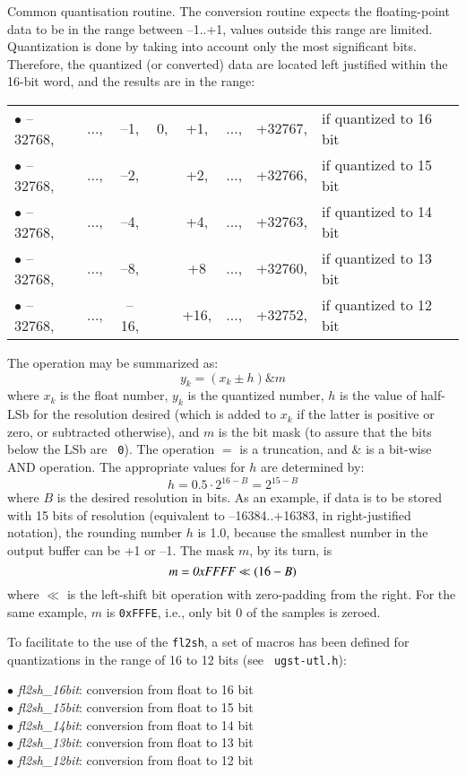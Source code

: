 Common quantisation routine. The conversion routine expects the
floating-point data to be in the range between --1..+1, values outside
this range are limited. Quantization is done by taking into account
only the most significant bits. Therefore, the quantized (or
converted) data are located left justified within the 16-bit word, and
the results are in the range:
\begin{center}
\normalsize\SF
\begin{tabular}{lccccccl}
 $\bullet$ --32768, &..., &--1, &0,&+1, &..., &+32767, &if quantized to 16 bit\\
 $\bullet$ --32768, &..., &--2, &&+2,  &..., &+32766, &if quantized to 15 bit\\
 $\bullet$ --32768, &..., &--4, &&+4,  &..., &+32763, &if quantized to 14 bit\\
 $\bullet$ --32768, &..., &--8, &&+8   &..., &+32760, &if quantized to 13 bit\\
 $\bullet$ --32768, &..., &--16,&&+16, &..., &+32752, &if quantized to 12 bit\\
\end{tabular}
\end{center}

        The operation may be summarized as:
\[
              y_k = (x_k \pm h) \& m
\]
where $x_k$ is the float number, $y_k$ is the quantized number, $h$ is
the value of half-LSb for the resolution desired (which is added to
$x_k$ if the latter is positive or zero, or subtracted otherwise), and
$m$ is the bit mask (to assure that the bits below the LSb are {\tt
0}). The operation $=$ is a truncation, and $\&$ is a bit-wise AND
operation. The appropriate values for $h$ are determined by:
\[
              h = 0.5 \cdot 2^{16-B} = 2^{15-B}
\]
where $B$ is the desired resolution in bits. As an example, if
data is to be stored with 15 bits of resolution (equivalent to
--16384..+16383, in right-justified notation), the rounding number $h$
is 1.0, because the smallest number in the output buffer can be +1 or
--1. The mask $m$, by its turn, is
\[
              m = \mbox{\em 0xFFFF} \ll (16-B)
\]
where $\ll$ is the left-shift bit operation with zero-padding from the
right. For the same example, $m$ is {\tt 0xFFFE}, i.e., only bit 0 of the
samples is zeroed.

To facilitate to the use of the {\tt fl2sh}, a set of macros has been
defined for quantizations in the range of 16 to 12 bits (see {\tt
ugst-utl.h}):

\begin{minipage}{140mm}
  $\bullet$  {\em fl2sh\_16bit}: conversion from float to 16 bit\\
  $\bullet$  {\em fl2sh\_15bit}: conversion from float to 15 bit\\
  $\bullet$  {\em fl2sh\_14bit}: conversion from float to 14 bit\\
  $\bullet$  {\em fl2sh\_13bit}: conversion from float to 13 bit\\
  $\bullet$  {\em fl2sh\_12bit}: conversion from float to 12 bit\\
\end{minipage}

